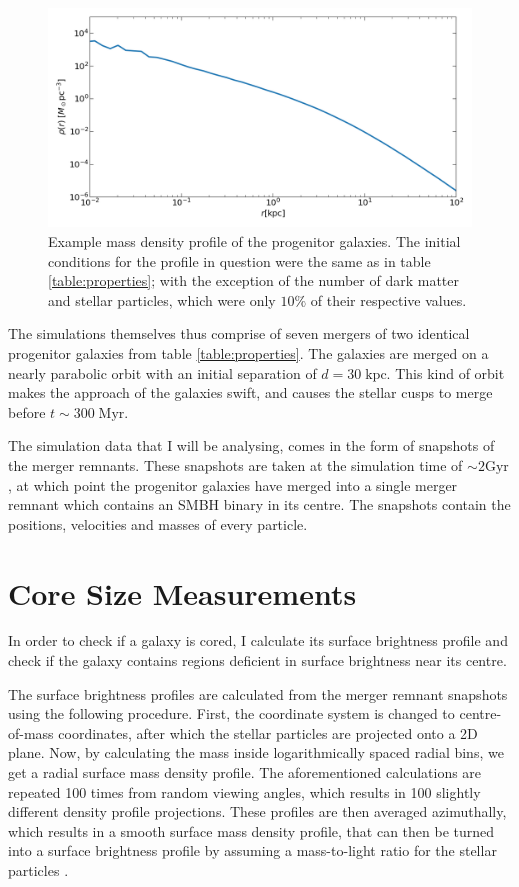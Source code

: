 \documentclass[english, oneside]{HYgradu}
\begin{document}
\begin{figure}
	\centering
	\includegraphics[width=\textwidth]{IC.png}
	\caption{Example mass density profile of the progenitor galaxies. The initial conditions for the profile in question were the same as in table \ref{table:properties}; with the exception of the number of dark matter and stellar particles, which were only $10\%$ of their respective values.}
	\label{figure:IC_density_profile}
\end{figure}

The simulations themselves thus comprise of seven mergers of two identical progenitor galaxies from table \ref{table:properties}. The galaxies are merged on a nearly parabolic orbit with an initial separation of $d = 30 \; \mathrm{kpc}$. This kind of orbit makes the approach of the galaxies swift, and causes the stellar cusps to merge before $t \sim 300 \; \mathrm{Myr}$.

The simulation data that I will be analysing, comes in the form of snapshots of the merger remnants. These snapshots are taken at the simulation time of $\sim 2 \mathrm{Gyr}$, at which point the progenitor galaxies have merged into a single merger remnant which contains an SMBH binary in its centre. The snapshots contain the positions, velocities and masses of every particle.

\section{Core Size Measurements}

In order to check if a galaxy is cored, I calculate its surface brightness profile and check if the galaxy contains regions deficient in surface brightness near its centre.

The surface brightness profiles are calculated from the merger remnant snapshots using the following procedure. First, the coordinate system is changed to centre-of-mass coordinates, after which the stellar particles are projected onto a 2D plane. Now, by calculating the mass inside logarithmically spaced radial bins, we get a radial surface mass density profile. The aforementioned calculations are repeated 100 times from random viewing angles, which results in 100 slightly different density profile projections. These profiles are then averaged azimuthally, which results in a smooth surface mass density profile, that can then be turned into a surface brightness profile by assuming a mass-to-light ratio for the stellar particles \citep{Rantala2018}. 
\end{document}
